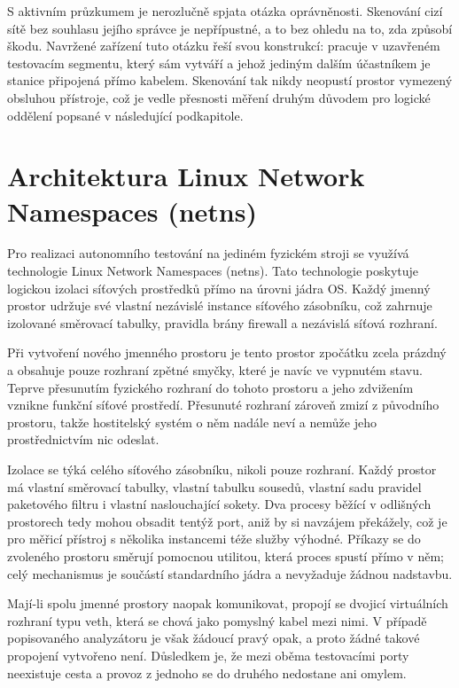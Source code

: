 S aktivním průzkumem je nerozlučně spjata otázka oprávněnosti. Skenování cizí sítě bez souhlasu jejího správce je nepřípustné, a to bez ohledu na to, zda způsobí škodu. Navržené zařízení tuto otázku řeší svou konstrukcí: pracuje v uzavřeném testovacím segmentu, který sám vytváří a jehož jediným dalším účastníkem je stanice připojená přímo kabelem. Skenování tak nikdy neopustí prostor vymezený obsluhou přístroje, což je vedle přesnosti měření druhým důvodem pro logické oddělení popsané v následující podkapitole.

\section{Architektura Linux Network Namespaces (netns)}
\label{sec:netns_teorie}

Pro realizaci autonomního testování na jediném fyzickém stroji se využívá technologie Linux Network Namespaces (netns). Tato technologie poskytuje logickou izolaci síťových prostředků přímo na úrovni jádra OS. Každý jmenný prostor udržuje své vlastní nezávislé instance síťového zásobníku, což zahrnuje izolované směrovací tabulky, pravidla brány firewall a nezávislá síťová rozhraní.

Při vytvoření nového jmenného prostoru je tento prostor zpočátku zcela prázdný a obsahuje pouze rozhraní zpětné smyčky, které je navíc ve vypnutém stavu. Teprve přesunutím fyzického rozhraní do tohoto prostoru a jeho zdvižením vznikne funkční síťové prostředí. Přesunuté rozhraní zároveň zmizí z původního prostoru, takže hostitelský systém o něm nadále neví a nemůže jeho prostřednictvím nic odeslat.

Izolace se týká celého síťového zásobníku, nikoli pouze rozhraní. Každý prostor má vlastní směrovací tabulky, vlastní tabulku sousedů, vlastní sadu pravidel paketového filtru i vlastní naslouchající sokety. Dva procesy běžící v odlišných prostorech tedy mohou obsadit tentýž port, aniž by si navzájem překážely, což je pro měřicí přístroj s několika instancemi téže služby výhodné. Příkazy se do zvoleného prostoru směrují pomocnou utilitou, která proces spustí přímo v něm; celý mechanismus je součástí standardního jádra a nevyžaduje žádnou nadstavbu.

Mají-li spolu jmenné prostory naopak komunikovat, propojí se dvojicí virtuálních rozhraní typu veth, která se chová jako pomyslný kabel mezi nimi. V případě popisovaného analyzátoru je však žádoucí pravý opak, a proto žádné takové propojení vytvořeno není. Důsledkem je, že mezi oběma testovacími porty neexistuje cesta a provoz z jednoho se do druhého nedostane ani omylem.

